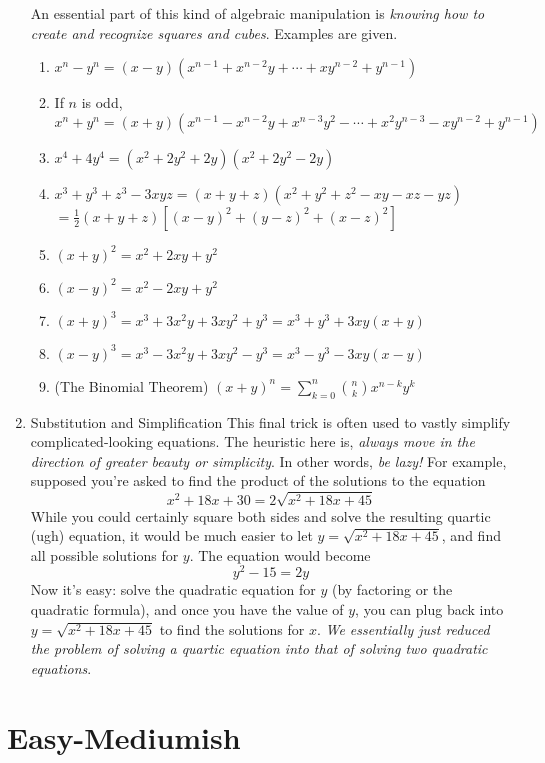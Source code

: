\documentclass{article}
\theoremstyle{definition}
\theoremstyle{remark}
\begin{document}
\begin{enumerate}[label=\Roman*.]
    An essential part of this kind of algebraic manipulation is \emph{knowing how to create and recognize squares and cubes}. Examples are given.
    \begin{enumerate}[label=(\alph*)]
    \item $x^n - y^n = (x-y)(x^{n-1}+x^{n-2}y + \cdots + xy^{n-2}+y^{n-1})$ 
    \item If $n$ is odd, $x^n + y^n=(x+y)(x^{n-1}-x^{n-2}y+x^{n-3}y^2-\cdots + x^2y^{n-3}-xy^{n-2}+y^{n-1})$
    \item $x^{4} + 4y^{4} = (x^2 + 2y^2 + 2y)(x^2 + 2y^2-2y)$ 
    \item $x^3 + y^3 + z^3 - 3xyz = (x + y + z)(x^2 + y^2 + z^2 -xy - xz - yz)$\\$ = \frac{1}{2}(x+y+z)\left[ (x-y)^2 + (y-z)^2 + (x-z)^2\right]$ 
    \item $(x+y)^2 =x^2+2xy+y^2$
    \item $(x-y)^2 = x^2 -2xy+y^2$
    \item $(x+y)^3 = x^3 + 3x^2y +3xy^2 + y^3 = x^3 + y^3 +3xy(x+y)$
    \item $(x-y)^3 = x^3 - 3x^2y+3xy^2-y^3 = x^3 - y^3 -3xy(x-y)$
    \item (The Binomial Theorem) $(x+y)^n = \sum_{k=0}^n \binom{n}{k} x^{n-k}y^k$
\end{enumerate}
    \item Substitution and Simplification
    This final trick is often used to vastly simplify complicated-looking equations. The heuristic here is, \emph{always move in the direction of greater beauty or simplicity}. In other words, \emph{be lazy!} For example, supposed you're asked to find the product of the solutions to the equation \begin{equation}x^2+18x+30 = 2\sqrt{x^2 + 18x + 45}\end{equation} While you could certainly square both sides and solve the resulting quartic (ugh) equation, it would be much easier to let $y=\sqrt{x^2 + 18x + 45}$, and find all possible solutions for $y$. The equation would become
    \[y^2-15 = 2y\]
    Now it's easy: solve the quadratic equation for $y$ (by factoring or the quadratic formula), and once you have the value of $y$, you can plug back into $y=\sqrt{x^2 + 18x + 45}$ to find the solutions for $x$. \emph{We essentially just reduced the problem of solving a quartic equation into that of solving two quadratic equations}.
\end{enumerate}

\section{Easy-Mediumish}
\end{document}
